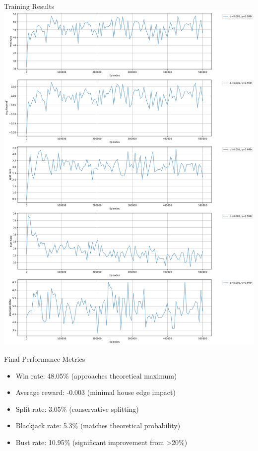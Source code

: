 \documentclass{beamer}
\begin{document}
\begin{frame}{Training Results}
    \includegraphics[width=\textwidth]{./images/learning_curves_summary.png}
    
    \begin{block}{Final Performance Metrics}
        \begin{itemize}
            \item Win rate: 48.05\% (approaches theoretical maximum)
            \item Average reward: -0.003 (minimal house edge impact)
            \item Split rate: 3.05\% (conservative splitting)
            \item Blackjack rate: 5.3\% (matches theoretical probability)
            \item Bust rate: 10.95\% (significant improvement from >20\%)
        \end{itemize}
    \end{block}
\end{frame}
\end{document}

